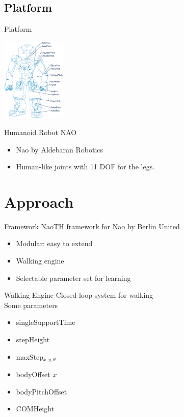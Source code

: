 \documentclass{beamer}
\begin{document}
\subsection{Platform}
\begin{frame}{Platform}
	\begin{center}
		\includegraphics[width = 0.23\textwidth]{naospecsJoints}
	\end{center}
	\begin{block}{Humanoid Robot NAO}
		\begin{itemize}
			\item Nao by Aldebaran Robotics
			\item Human-like joints with 11 DOF for the legs.
		\end{itemize}
	\end{block}
\end{frame}

\section{Approach}
\begin{frame}{Framework}
NaoTH framework for Nao by Berlin United \cite{naothdescription}
\begin{itemize}
\item Modular: easy to extend
\item Walking engine
\item Selectable parameter set for learning
\end{itemize}
\end{frame}

\begin{frame}{Walking Engine}
	Closed loop system for walking\\
	Some parameters
	\begin{itemize}
		\item singleSupportTime
		\item stepHeight
		\item maxStep$_{x, y, \theta}$
		\item bodyOffset $x$
		\item bodyPitchOffset
		\item COMHeight
	\end{itemize}
\end{frame}		
\end{document}
